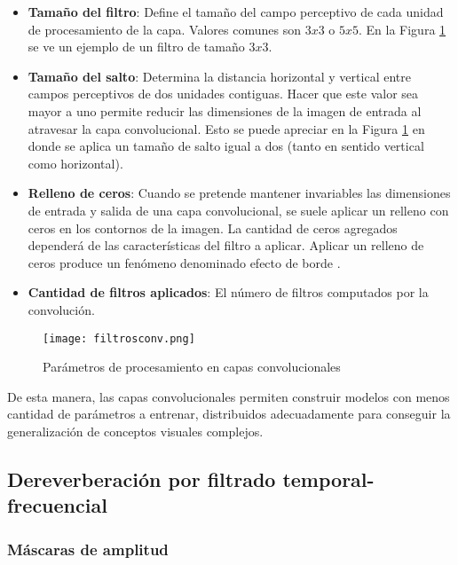 \begin{itemize}
\item\textbf{Tamaño del filtro}: Define el tamaño del campo perceptivo de cada unidad de procesamiento de la capa. Valores comunes son $3x3$ o $5x5$. En la Figura \ref{fig:variables_conv} se ve un ejemplo de un filtro de tamaño $3x3$.

\item\textbf{Tamaño del salto}: Determina la distancia horizontal y vertical entre campos perceptivos de dos unidades contiguas. Hacer que este valor sea mayor a uno permite reducir las dimensiones de la imagen de entrada al atravesar la capa convolucional. Esto se puede apreciar en la Figura \ref{fig:variables_conv} en donde se aplica un tamaño de salto igual a dos (tanto en sentido vertical como horizontal). 

\item\textbf{Relleno de ceros}: Cuando se pretende mantener invariables las dimensiones de entrada y salida de una capa convolucional, se suele aplicar un relleno con ceros en los contornos de la imagen. La cantidad de ceros agregados dependerá de las características del filtro a aplicar. Aplicar un relleno de ceros produce un fenómeno denominado efecto de borde \cite{lagartija}. 

\item\textbf{Cantidad de filtros aplicados}: El número de filtros computados por la convolución. 

\end{itemize}

\begin{figure}[H]
  \centering{}
  \texttt{[image: filtrosconv.png]}
  \caption{Parámetros de procesamiento en capas convolucionales}
  \label{fig:variables_conv}
\end{figure}

De esta manera, las capas convolucionales permiten construir modelos con menos cantidad de parámetros a entrenar, distribuidos adecuadamente para conseguir la generalización de conceptos visuales complejos. 

\subsection{Dereverberación por filtrado temporal-frecuencial}

\subsubsection{Máscaras de amplitud}

